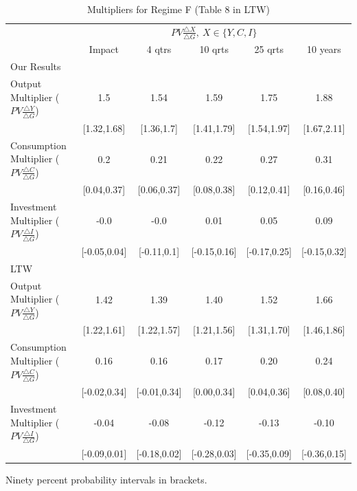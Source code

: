 \documentclass[letterpaper,12pt]{article}%
\begin{document}
\begin{table}[H]
	\centering
	\begin{threeparttable}
		\caption{Multipliers for Regime F (Table 8 in LTW)}
		\begin{tabular}{l c c c c c}
			\toprule
			& \multicolumn{5}{c}{$PV \frac{\triangle X}{\triangle G} , \ X \in \{Y,C,I\}$}\\
			\cmidrule{2-6}
			& Impact & 4 qtrs & 10 qrts & 25 qrts & 10 years \\
			\midrule
			Our Results&     &   &  &   &   \\
			\quad Output Multiplier ($PV \frac{ \triangle Y}{\triangle G}$)&  1.5 & 1.54 & 1.59 & 1.75 & 1.88 \\
			\quad &  [1.32,1.68] & [1.36,1.7] & [1.41,1.79] & [1.54,1.97] & [1.67,2.11] \\
			\quad Consumption Multiplier ($PV \frac{ \triangle C}{\triangle G}$)&  0.2 & 0.21 & 0.22 & 0.27 & 0.31\\
			\quad &   [0.04,0.37] & [0.06,0.37] & [0.08,0.38] & [0.12,0.41] & [0.16,0.46] \\
			\quad Investment Multiplier ($PV \frac{ \triangle I}{\triangle G}$)&  -0.0 & -0.0 & 0.01 & 0.05 & 0.09 \\
			\quad &   [-0.05,0.04] & [-0.11,0.1] & [-0.15,0.16] & [-0.17,0.25] & [-0.15,0.32] \\
			LTW&     &   &  &   &   \\
			\quad Output Multiplier ($PV \frac{ \triangle Y}{\triangle G}$)&  1.42 & 1.39 & 1.40 & 1.52 & 1.66 \\
			\quad &   [1.22,1.61] & [1.22,1.57] & [1.21,1.56] & [1.31,1.70] & [1.46,1.86] \\
			\quad Consumption Multiplier ($PV \frac{ \triangle C}{\triangle G}$)&  0.16 & 0.16 & 0.17 & 0.20 & 0.24\\
			\quad &   [-0.02,0.34] & [-0.01,0.34] & [0.00,0.34] & [0.04,0.36] & [0.08,0.40] \\
			\quad Investment Multiplier ($PV \frac{ \triangle I}{\triangle G}$)&  -0.04 & -0.08 & -0.12 & -0.13 & -0.10 \\
			\quad &   [-0.09,0.01] & [-0.18,0.02] & [-0.28,0.03] & [-0.35,0.09] & [-0.36,0.15] \\
			\bottomrule    
		\end{tabular}
	\begin{tablenotes}
		\item Ninety percent probability intervals in brackets.
	\end{tablenotes}
		\label{tab:RWMH_F}
	\end{threeparttable}
\end{table}
\end{document}
